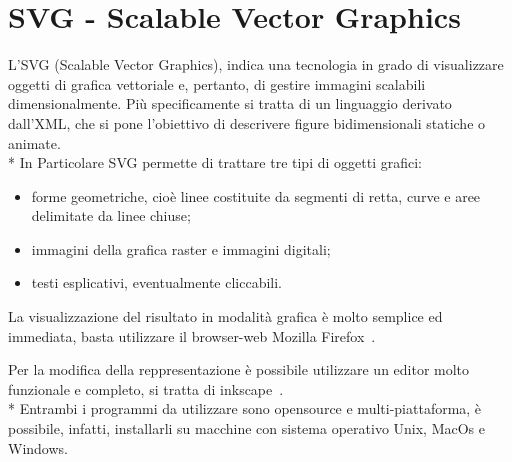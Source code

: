 \section{SVG - Scalable Vector Graphics} 
L'SVG (Scalable Vector Graphics), indica una tecnologia in grado di visualizzare oggetti 
di grafica vettoriale e, pertanto, di gestire immagini scalabili dimensionalmente.
Più specificamente si tratta di un linguaggio derivato dall'XML, che si pone l'obiettivo 
di descrivere figure bidimensionali statiche o animate. \\*
In Particolare SVG permette di trattare tre tipi di oggetti grafici:

\begin{itemize}
  \item forme geometriche, cioè linee costituite da segmenti di retta, curve e
  aree delimitate da linee chiuse;
  \item immagini della grafica raster e immagini digitali;
  \item testi esplicativi, eventualmente cliccabili.
\end{itemize} 
 
La visualizzazione del risultato in modalità grafica è molto semplice ed
immediata, basta utilizzare il browser-web Mozilla
Firefox~\cite{firefox_website:1}.

Per la modifica della reppresentazione è possibile utilizzare un editor molto
funzionale e completo, si tratta di inkscape~\cite{Inkscape_website:1}. \\* 
Entrambi i programmi da utilizzare sono opensource e
multi-piattaforma, è possibile, infatti, installarli su macchine con sistema 
operativo Unix, MacOs e Windows.
     


 